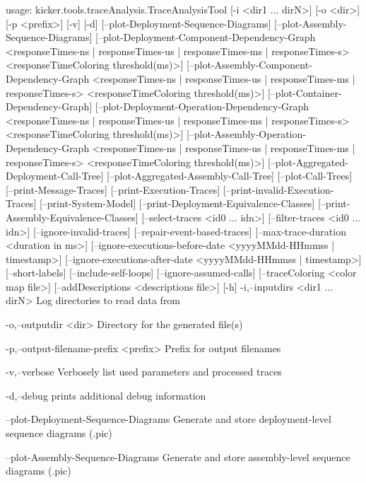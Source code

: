 usage: kicker.tools.traceAnalysis.TraceAnalysisTool [-i <dir1 ... dirN>]
       [-o <dir>] [-p <prefix>] [-v] [-d]
       [--plot-Deployment-Sequence-Diagrams]
       [--plot-Assembly-Sequence-Diagrams]
       [--plot-Deployment-Component-Dependency-Graph <responseTimes-ns |
       responseTimes-us | responseTimes-ms | responseTimes-s>
       <responseTimeColoring threshold(ms)>]
       [--plot-Assembly-Component-Dependency-Graph <responseTimes-ns |
       responseTimes-us | responseTimes-ms | responseTimes-s>
       <responseTimeColoring threshold(ms)>]
       [--plot-Container-Dependency-Graph]
       [--plot-Deployment-Operation-Dependency-Graph <responseTimes-ns |
       responseTimes-us | responseTimes-ms | responseTimes-s>
       <responseTimeColoring threshold(ms)>]
       [--plot-Assembly-Operation-Dependency-Graph <responseTimes-ns |
       responseTimes-us | responseTimes-ms | responseTimes-s>
       <responseTimeColoring threshold(ms)>]
       [--plot-Aggregated-Deployment-Call-Tree]
       [--plot-Aggregated-Assembly-Call-Tree] [--plot-Call-Trees]
       [--print-Message-Traces] [--print-Execution-Traces]
       [--print-invalid-Execution-Traces] [--print-System-Model]
       [--print-Deployment-Equivalence-Classes]
       [--print-Assembly-Equivalence-Classes] [--select-traces <id0 ...
       idn>] [--filter-traces <id0 ... idn>] [--ignore-invalid-traces]
       [--repair-event-based-traces] [--max-trace-duration <duration in
       ms>] [--ignore-executions-before-date <yyyyMMdd-HHmmss |
       timestamp>] [--ignore-executions-after-date <yyyyMMdd-HHmmss |
       timestamp>] [--short-labels] [--include-self-loops]
       [--ignore-assumed-calls] [--traceColoring <color map file>]
       [--addDescriptions <descriptions file>] [-h]
 -i,--inputdirs <dir1 ... dirN>
        Log directories to read data from

 -o,--outputdir <dir>
        Directory for the generated file(s)

 -p,--output-filename-prefix <prefix>
        Prefix for output filenames
        

 -v,--verbose
        Verbosely list used parameters and processed traces

 -d,--debug
        prints additional debug information

    --plot-Deployment-Sequence-Diagrams
        Generate and store deployment-level sequence diagrams (.pic)

    --plot-Assembly-Sequence-Diagrams
        Generate and store assembly-level sequence diagrams (.pic)

